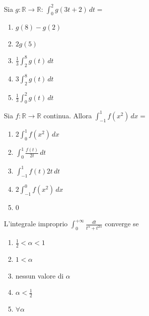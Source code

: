 \begin{quiz}
Sia $g:\mathbb R\to\mathbb R$: $\displaystyle\int_0^2 g(3t+2)\,dt=$

\begin{enumerate}
\item $g(8)-g(2)$
\item $2g(5)$
\item $\frac13\int_2^8 g(t)\,dt$
\item $3\int_2^8 g(t)\,dt$
\item $\frac13\int_0^2 g(t)\,dt$
\end{enumerate}
\end{quiz}

\begin{quiz}
Sia $f:\mathbb R\to\mathbb R$ continua. Allora $\displaystyle\int_{-1}^{1} f(x^2)\,dx=$

\begin{enumerate}
\item $2\int_0^1 f(x^2)\,dx$
\item $\int_0^1\frac{f(t)}{2t}\,dt$
\item $\int_{-1}^1 f(t)2t\,dt$
\item $2\int_{-1}^0 f(x^2)\,dx$
\item $0$
\end{enumerate}
\end{quiz}

\begin{quiz}
L’integrale improprio $\displaystyle\int_0^{+\infty}\frac{dt}{t^\alpha+t^{2\alpha}}$ converge se

\begin{enumerate}
\item $\frac12<\alpha<1$
\item $1<\alpha$
\item nessun valore di $\alpha$
\item $\alpha<\frac12$
\item $\forall\alpha$
\end{enumerate}
\end{quiz}

